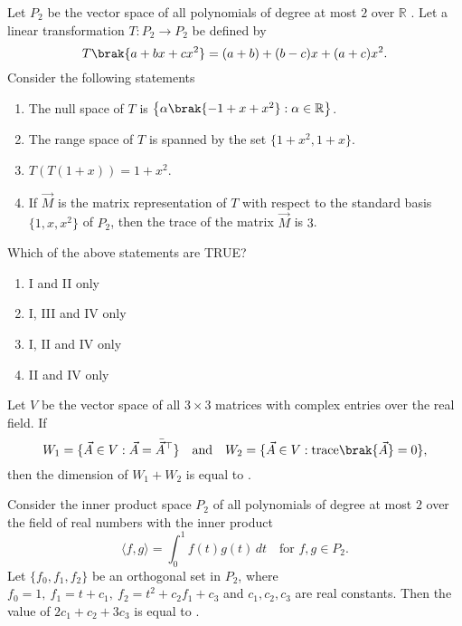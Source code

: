 \item Let $P_{2}$ be the vector space of all polynomials of degree at most $2$ over $\mathbb{R}$ . Let a linear transformation $T: P_{2}\to P_{2}$ be defined by
\[
T\brak{a+bx+cx^{2}}=(a+b)+(b-c)x+(a+c)x^{2}.
\]
Consider the following statements
\begin{enumerate}[label=\Roman*.]
	\item The null space of $T$ is $\left\{\alpha \brak{-1+x+x^{2}} : \alpha \in \mathbb{R}\right\}$.  
	\item The range space of $T$ is spanned by the set $\{1+x^{2},1+x\}$.  
	\item $T(T(1+x))=1+x^{2}$.  
	\item If $\vec{M}$ is the matrix representation of $T$ with respect to the standard basis $\{1,x,x^{2}\}$ of $P_{2}$, then the trace of the matrix $\vec{M}$ is $3$.  
\end{enumerate}
Which of the above statements are TRUE?
\hfill{}
\begin{multicols}{2}
\begin{enumerate}
\item I and II only
\item I, III and IV only
\item I, II and IV only
\item II and IV only
\end{enumerate}
\end{multicols}
\item Let $V$ be the vector space of all $3\times 3$ matrices with complex entries over the real field. If
\[
W_{1}=\{\vec{A}\in V : \vec{A}=\bar{\vec{A}}^{\top}\}\quad \text{and}\quad W_{2}=\{\vec{A}\in V : \text{trace}\brak{\vec{A}}=0\},
\]
then the dimension of $W_{1}+W_{2}$ is equal to \underline{\hspace{2cm}}.  
\hfill{}
\item Consider the inner product space $P_{2}$ of all polynomials of degree at most $2$ over the field of real numbers with the inner product 
\[
\langle f,g\rangle = \int_{0}^{1} f(t)g(t)\, dt \quad \text{for } f,g \in P_{2}.
\]
Let $\{f_{0},f_{1},f_{2}\}$ be an orthogonal set in $P_{2}$, where $f_{0}=1,\ f_{1}=t+c_{1},\ f_{2}=t^{2}+c_{2}f_{1}+c_{3}$ and $c_{1},c_{2},c_{3}$ are real constants. Then the value of $2c_{1}+c_{2}+3c_{3}$ is equal to \underline{\hspace{2cm}}.
\hfill{}

